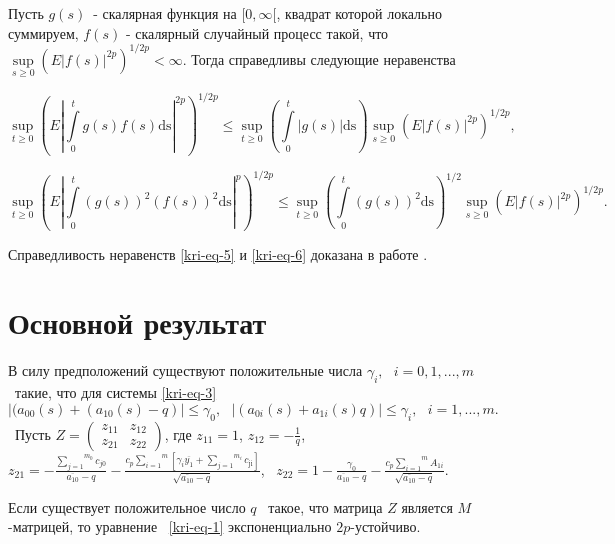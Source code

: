 \begin{lemma}
Пусть  $g(s)$\ {}- скалярная функция на  $[0,\infty [$, квадрат которой локально суммируем,
$f(s)$ {}- скалярный случайный процесс такой, что  $\underset{s\ge 0} \sup \left(E|f(s)|^{2p}\right)^{1/2p} <\infty $. Тогда справедливы следующие неравенства

\begin{equation}\label{kri-eq-5}
	\underset{t\ge 0}\sup\left(E\left|\int\limits_{0}^{t} g(s)f(s)\text{ds}\right|^{2p}\right)^{1/2p}\le \underset{t\ge 0}\sup\left(\int\limits_{0}^{t} |g(s)|\text{ds}\right)\underset{s\ge
		0}\sup\left(E|f(s)|^{2p}\right)^{1/2p},
\end{equation}

\begin{equation}\label{kri-eq-6}
	\underset{t\ge 0}\sup\left(E\left| \int\limits_{0}^{t} (g(s))^2(f(s))^2\text{ds}\right|^p\right)^{1/2p}\le \underset{t\ge 0}\sup\left(\int\limits_{0}^{t} 	(g(s))^2\text{ds}\right)^{1/2}\underset{s\ge
		0}\sup\left(E|f(s)|^{2p}\right)^{1/2p}.
\end{equation}
\end{lemma}
Справедливость неравенств \eqref{kri-eq-5} и \eqref{kri-eq-6} доказана в работе \cite{kri-bib-21}.

\section{Основной результат}

В силу предположений существуют положительные числа  $\gamma _i,\text{  }i=0,1,...,m$ \ такие, что для системы \eqref{kri-eq-3}
$|(a_{00}(s)+(a_{10}(s)-q)|\le \gamma _0,\text{  }|(a_{0i}(s)+a_{1i}(s)q)|\le \gamma _i,\text{  }i=1,...,m.$ \ Пусть
$Z=\left(\begin{matrix}z_{11}&z_{12}\\z_{21}&z_{22}\end{matrix}\right)$, где  $z_{11}=1$,  $z_{12}=-\frac 1 q$,
$z_{21}=-\frac{\overset{m_0}{\underset{j=1}{\sum }}c_{\mathit{j0}}}{\overline{a_{10}}-q}-\frac{c_p\overset
m{\underset{i=1}{\sum }}\left[\gamma _i\overline{y_1}+\overset{m_i}{\underset{j=1}{\sum
}}c_{\text{ji}}\right]}{\sqrt{\overline{a_{10}}-q}}$, \  $z_{22}=1-\frac{\gamma
_0}{\overline{a_{10}}-q}-\frac{c_p\overset m{\underset{i=1}{\sum }}A_{1i}}{\sqrt{\overline{a_{10}}-q}}.$

\begin{theorem}
Если существует положительное число  $q$ \ такое, что матрица  $Z$ является  $M${}-матрицей, то
уравнение \ \eqref{kri-eq-1} экспоненциально  $2p${}-устойчиво.
\end{theorem}


